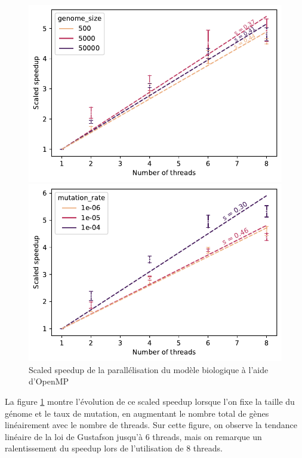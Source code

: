 \documentclass[a4paper, 10pt, twoside]{article}
\begin{document}
\begin{figure}[htb]
	\centering
	\begin{minipage}{0.45\textwidth}
		\centering
		\includegraphics[width=\textwidth]{img/weak_speedup_genome_size.pdf}
	\end{minipage}
	\begin{minipage}{0.45\textwidth}
		\includegraphics[width=\textwidth]{img/weak_speedup_mutation_rate.pdf}
	\end{minipage}
	\caption{Scaled speedup de la parallélisation du modèle biologique à l'aide d'OpenMP}
	\label{fig:scaled-speedup/omp}
\end{figure}

La figure \ref{fig:scaled-speedup/omp} montre l'évolution de ce scaled speedup lorsque l'on fixe la taille du génome et le taux de mutation, en augmentant le nombre total de gènes linéairement avec le nombre de threads. Sur cette figure, on observe la tendance linéaire de la loi de Gustafson jusqu'à 6 threads, mais on remarque un ralentissement du speedup lors de l'utilisation de 8 threads.
\end{document}
